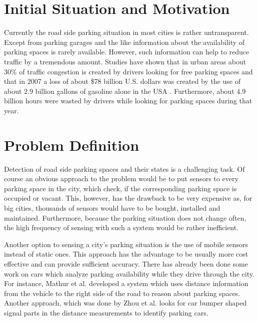 \documentclass[11pt,a4paper,titlepage,
chapterprefix,headsepline,parskip,pdftex,
,pointlessnumbers,bibtotoc]{article}
\begin{document}


%
%
%
%

\newpage
{}

\section{Initial Situation and Motivation}
Currently the road side parking situation in most cities is rather untransparent. Except from parking garages and the like information about the availability of parking spaces is rarely available. However, such information can help to reduce traffic by a tremendous amount. Studies have shown that in urban areas about 30\% of traffic congestion is created by drivers looking for free parking spaces \cite{Nawaz:2013:PSB:2500423.2500438} and that in 2007 a loss of about \$78 billion U.S. dollars was created by the use of about 2.9 billion gallons of gasoline alone in the USA \cite{TexasMobilityReport}. Furthermore, about 4.9 billion hours were wasted by drivers while looking for parking spaces during that year. 

\section{Problem Definition}

Detection of road side parking spaces and their states is a challenging task. Of course an obvious approach to the problem would be to put sensors to every parking space in the city, which check, if the corresponding parking space is occupied or vacant. This, however, has the drawback to be very expensive as, for big cities, thousands of sensors would have to be bought, installed and maintained. Furthermore, because the parking situation does not change often, the high frequency of sensing with such a system would be rather inefficient.

Another option to sensing a city's parking situation is the use of mobile sensors instead of static ones. This approach has the advantage to be usually more cost effective and can provide sufficient accuracy.
There has already been done some work on cars which analyze parking availability while they drive through the city. For instance, Mathur et al. \cite{Mathur:2010:PDS:1814433.1814448} developed a system which uses distance information from the vehicle to the right side of the road to reason about parking spaces. Another approach, which was done by Zhou et al. \cite{Zhou_2d_range} looks for car bumper shaped signal parts in the distance measurements to identify parking cars.
\end{document}
